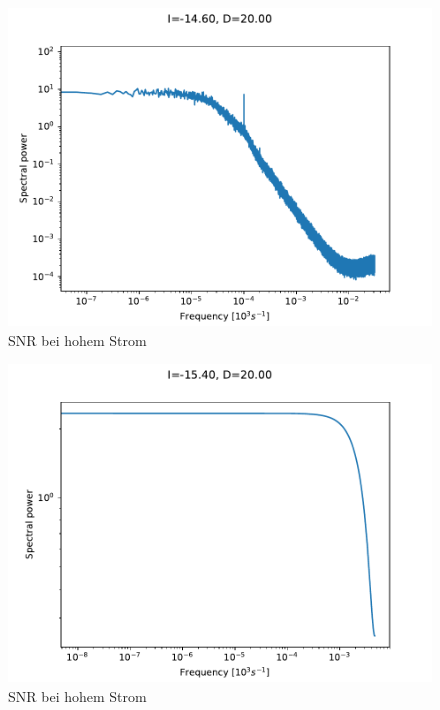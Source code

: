 \documentclass[12pt,a4paper]{article}
\begin{document}
\begin{figure}[H]
	\centering
	\includegraphics[scale=1]{d20i146.pdf}\caption{SNR bei hohem Strom}
	\label{spek203}
\end{figure}
\begin{figure}[H]
	\centering
	\includegraphics[scale=1]{d20i154.pdf}\caption{SNR bei hohem Strom}
	\label{spek202}
\end{figure}
\newpage
\end{document}

